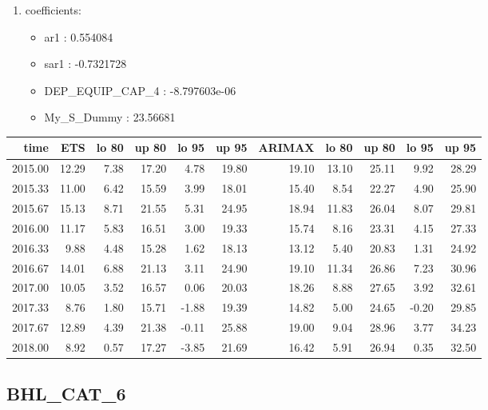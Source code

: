 \documentclass[10pt,a4paper]{article}\usepackage[]{graphicx}\usepackage[]{color}
\newcommand{\AaA}{\_}
\begin{document}
\begin{multicols}{2}
\begin{enumerate}
\item coefficients:
\begin{itemize}
\item  ar1 :  0.554084 
\item  sar1 :  -0.7321728 
\item  DEP\AaA EQUIP\AaA CAP\AaA 4 :  -8.797603e-06 
\item  My_S_Dummy :  23.56681 
\end{itemize}
\end{enumerate}
\end{multicols}
\begin{table}[ht]
\centering
\begin{tabular}{rrrrrrrrrrr}
  \hline
time & ETS  & lo 80 & up 80 & lo 95 & up 95 & ARIMAX  & lo 80 & up 80 & lo 95 & up 95 \\ 
  \hline
2015.00 & 12.29 & 7.38 & 17.20 & 4.78 & 19.80 & 19.10 & 13.10 & 25.11 & 9.92 & 28.29 \\ 
  2015.33 & 11.00 & 6.42 & 15.59 & 3.99 & 18.01 & 15.40 & 8.54 & 22.27 & 4.90 & 25.90 \\ 
  2015.67 & 15.13 & 8.71 & 21.55 & 5.31 & 24.95 & 18.94 & 11.83 & 26.04 & 8.07 & 29.81 \\ 
  2016.00 & 11.17 & 5.83 & 16.51 & 3.00 & 19.33 & 15.74 & 8.16 & 23.31 & 4.15 & 27.33 \\ 
  2016.33 & 9.88 & 4.48 & 15.28 & 1.62 & 18.13 & 13.12 & 5.40 & 20.83 & 1.31 & 24.92 \\ 
  2016.67 & 14.01 & 6.88 & 21.13 & 3.11 & 24.90 & 19.10 & 11.34 & 26.86 & 7.23 & 30.96 \\ 
  2017.00 & 10.05 & 3.52 & 16.57 & 0.06 & 20.03 & 18.26 & 8.88 & 27.65 & 3.92 & 32.61 \\ 
  2017.33 & 8.76 & 1.80 & 15.71 & -1.88 & 19.39 & 14.82 & 5.00 & 24.65 & -0.20 & 29.85 \\ 
  2017.67 & 12.89 & 4.39 & 21.38 & -0.11 & 25.88 & 19.00 & 9.04 & 28.96 & 3.77 & 34.23 \\ 
  2018.00 & 8.92 & 0.57 & 17.27 & -3.85 & 21.69 & 16.42 & 5.91 & 26.94 & 0.35 & 32.50 \\ 
   \hline
\end{tabular}
\end{table}

\newpage
\subsection{BHL\AaA CAT\AaA 6}
\end{document}
